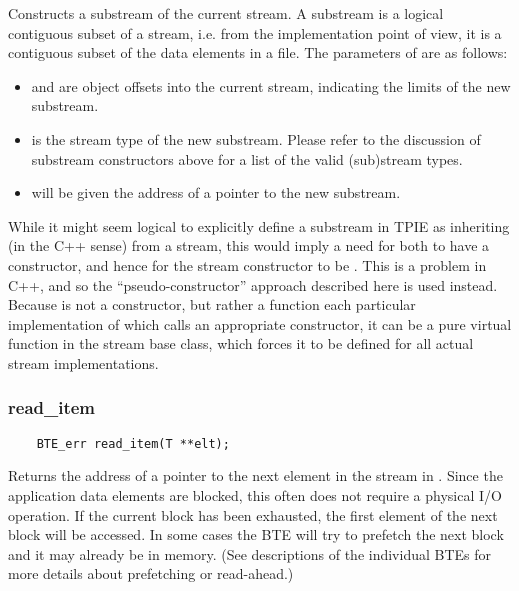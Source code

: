 Constructs a substream of the current stream.  A substream
is a logical contiguous subset of a stream, i.e. from the
implementation point of view, it is a contiguous subset of
the data elements in a file.  The parameters of
 are as follows:
\begin{itemize}
    \item {} and  are
    object offsets into the current stream, indicating the
    limits of the new substream.
    
    \item {} is the stream type of the new
    substream. Please refer to the discussion of substream
    constructors above for a list of the valid (sub)stream
    types.

    \item {} will be given the address of
    a pointer to the new substream.
\end{itemize}

While it might seem logical to explicitly define a substream
in TPIE as inheriting (in the C++ sense) from a stream, this
would imply a need for both to have a constructor, and hence
for the stream constructor to be . This is a
problem in C++, and so the ``pseudo-constructor'' approach
described here is used instead.
Because  is not a constructor, but rather a
function each particular implementation of which calls an appropriate
constructor, it can be a pure virtual function in the stream base class,
which forces it to be defined for all actual stream
implementations.

\subsubsection{read\_item}
\begin{verbatim}
    BTE_err read_item(T **elt);
\end{verbatim}
Returns the address of a pointer to the next element in the
stream in . Since the application data elements are blocked,
this often does not require a physical I/O operation. If the
current block has been exhausted, the first element of the
next block will be accessed. In some cases the BTE will
try to prefetch the next block and it may already be in
memory. (See descriptions of the individual BTEs for more
details about prefetching or read-ahead.)

